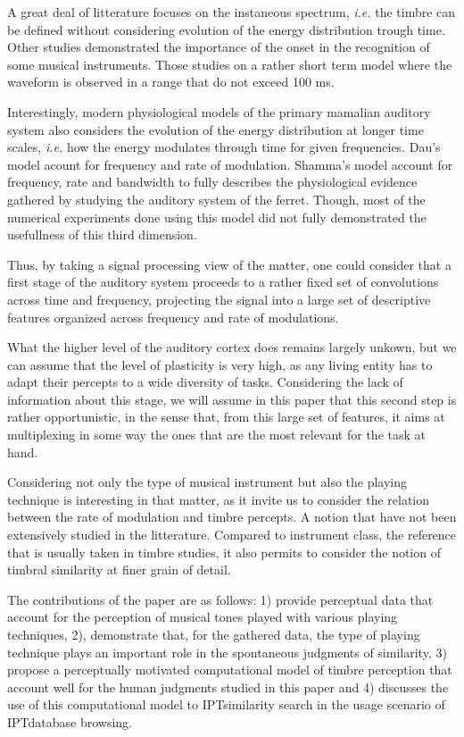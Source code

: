 \documentclass{article}
\newcommand{\ipt}{IPT}
\begin{document}
A great deal of litterature focuses on the instaneous spectrum, \textit{i.e.} the timbre can be defined without considering evolution of the energy distribution trough time. Other studies demonstrated the importance of the onset in the recognition of some musical instruments. Those studies on a rather short term model where the waveform is observed in a range that do not exceed 100 ms.

Interestingly, modern physiological models of the primary mamalian auditory system also considers the evolution of the energy distribution at longer time scales, \textit{i.e.} how the energy modulates through time for given frequencies.  Dau's model acount for frequency and rate of modulation. Shamma's model account for frequency, rate and bandwidth to fully describes the physiological evidence gathered by studying the auditory system of the ferret. Though, most of the numerical experiments done using this model did not fully demonstrated the usefullness of this third dimension.

Thus, by taking a signal processing view of the matter, one could consider that a first stage of the auditory system proceeds to a rather fixed set of convolutions across time and frequency, projecting the signal into a large set of descriptive features organized across frequency and rate of modulations.

What the higher level of the auditory cortex does remains largely unkown, but we can assume that the level of plasticity is very high, as any living entity has to adapt their percepts to a wide diversity of tasks.  Considering the lack of information about this stage, we will assume in this paper that this second step is rather opportunistic, in the sense that, from this large set of features, it aims at multiplexing in some way the ones that are the most relevant for the task at hand.

Considering not only the type of musical instrument but also the playing technique is interesting in that matter, as it invite us to consider the relation between the rate of modulation and timbre percepts. A notion that have not been extensively studied in the litterature. Compared to instrument class, the reference that is usually taken in timbre studies, it also permits to consider the notion of timbral similarity at finer grain of detail.

The contributions of the paper are as follows: 1) provide perceptual data that account for the perception of musical tones played with various playing techniques, 2), demonstrate that, for the gathered data, the type of playing technique plays an important role in the spontaneous judgments of similarity, 3) propose a perceptually motivated computational model of timbre perception that account well for the human judgments studied in this paper and 4) discusses the use of this computational model to \ipt similarity search in the usage scenario of \ipt database browsing.
\end{document}
